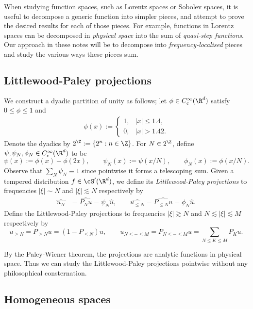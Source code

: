 When studying function spaces, such as Lorentz spaces or Sobolev spaces, it is useful to decompose a generic function into simpler pieces, and attempt to prove the desired results for each of those pieces. For example, functions in Lorentz spaces can be decomposed in \textit{physical space} into the sum of \textit{quasi-step functions}. Our approach in these notes will be to decompose into \textit{frequency-localised} pieces and  study the various ways these pieces sum. 

\subsection{Littlewood-Paley projections}

We construct a dyadic partition of unity as follows; let $\phi  \in C^\infty_c (\R^d)$ satisfy $0 \leq \phi \leq 1$ and 
\begin{align*}
	\phi(x) 
		:= 
		\begin{cases}
			1 , 				&|x| \leq 1.4, \\
			0, 				&|x| > 1.42. 
		\end{cases}
\end{align*}
Denote the dyadics by $2^\Z := \{ 2^n : n \in \Z \}$. For $N \in 2^\Z$, define $\psi, \psi_N, \phi_N \in C^\infty_c (\R^d)$ to be 
	\[ \psi(x) := \phi(x) - \phi(2x), \qquad \psi_N (x) := \psi(x/N), \qquad \phi_N (x) := \phi(x/N).  \]
Observe that $\sum_N \psi_N \equiv 1$ since pointwise it forms a telescoping sum. Given a tempered distribution $f \in \cS' (\R^d)$, we define its \emph{Littlewood-Paley projections} to frequencies $|\xi| \sim N$ and $|\xi| \lesssim N$ respectively by
	\begin{align*}
		\widehat{u_N} &= \widehat{P_N u}  = \psi_N \widehat u , \qquad
		\widehat{u_{\leq N}} = \widehat{P_{\leq N} u} = \phi_N \widehat u.
	\end{align*}	
Define the Littlewood-Paley projections to frequencies $|\xi| \gtrsim N$ and $N \lesssim |\xi| \lesssim M$ respectively by 
	\[ u_{\geq N} = P_{\geq N} u = (1 - P_{\leq N}) u, \qquad u_{N \leq - \leq M} = P_{N \leq - \leq M} u = \sum_{N \leq K \leq M} P_K u. \]

\begin{remark}
	By the Paley-Wiener theorem, the projections are analytic functions in physical space. Thus we can study the Littlewood-Paley projections pointwise without any philosophical consternation.
\end{remark}

\subsection{Homogeneous spaces}

